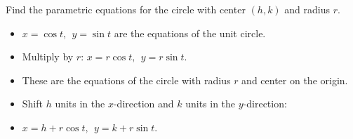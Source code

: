 \begin{frame}
\begin{example} %
Find the parametric equations for the circle with center $(h, k)$ and radius $r$.
\begin{itemize}
\item<2->  $x = \cos t,\ \  y = \sin t$ are the equations of the unit circle.
\item<3->  Multiply by $r$: $x = r\cos t,\ \  y = r\sin t$.
\item<4->  These are the equations of the circle with radius $r$ and center on the origin.
\item<5->  Shift $h$ units in the $x$-direction and $k$ units in the $y$-direction:
\item<5->  $x = h + r\cos t,\ \  y = k+ r\sin t$.
\end{itemize}
\end{example}
\end{frame}
